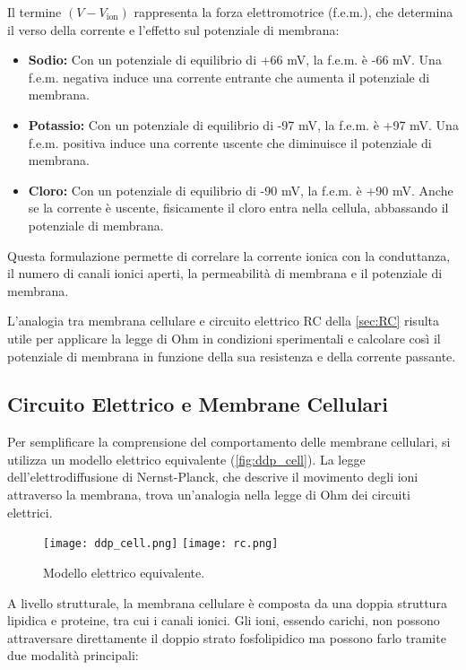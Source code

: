 Il termine \((V - V_{\text{ion}})\) rappresenta la forza elettromotrice (f.e.m.), che determina il verso della corrente e l'effetto sul potenziale di membrana:

\begin{itemize}
    \item \textbf{Sodio:} Con un potenziale di equilibrio di +66 mV, la f.e.m. è -66 mV. Una f.e.m. negativa induce una corrente entrante che aumenta il potenziale di membrana.
    \item \textbf{Potassio:} Con un potenziale di equilibrio di -97 mV, la f.e.m. è +97 mV. Una f.e.m. positiva induce una corrente uscente che diminuisce il potenziale di membrana.
    \item \textbf{Cloro:} Con un potenziale di equilibrio di -90 mV, la f.e.m. è +90 mV. Anche se la corrente è uscente, fisicamente il cloro entra nella cellula, abbassando il potenziale di membrana.
\end{itemize}

Questa formulazione permette di correlare la corrente ionica con la conduttanza, il numero di canali ionici aperti, la permeabilità di membrana e il potenziale di membrana.

L'analogia tra membrana cellulare e circuito elettrico RC della \autoref{sec:RC} risulta utile per applicare la legge di Ohm in condizioni sperimentali e calcolare così il potenziale di membrana in funzione della sua resistenza e della corrente passante.

\subsection{Circuito Elettrico e Membrane Cellulari}
\label{sec:RC}
Per semplificare la comprensione del comportamento delle membrane cellulari, si utilizza un modello elettrico equivalente (\autoref{fig:ddp_cell}). La legge dell’elettrodiffusione di Nernst-Planck, che descrive il movimento degli ioni attraverso la membrana, trova un'analogia nella legge di Ohm dei circuiti elettrici.

\begin{figure}[h]
    \centering
    \texttt{[image: ddp\_cell.png]}     \texttt{[image: rc.png]}
    \caption{Modello elettrico equivalente.}
    \label{fig:ddp_cell}
\end{figure}

A livello strutturale, la membrana cellulare è composta da una doppia struttura lipidica e proteine, tra cui i canali ionici. Gli ioni, essendo carichi, non possono attraversare direttamente il doppio strato fosfolipidico ma possono farlo tramite due modalità principali:

